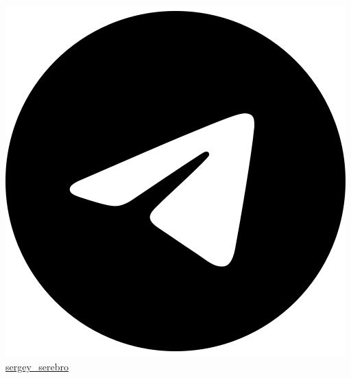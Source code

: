 \documentclass[]{external}
\begin{document}
{    \href{https://t.me/sergey_serebro}{\includegraphics[scale=0.03, trim={0cm 5cm -0.4cm -2cm}]{icons/main/telegram-brands-solid.png} sergey\_serebro}}

%
%
\end{document}
